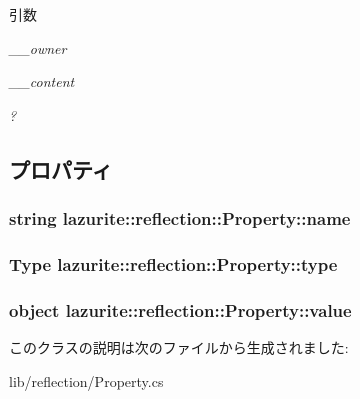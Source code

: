 \begin{DoxyParams}{引数}
\item[{\em \_\-\_\-owner}]\item[{\em \_\-\_\-content}]\item[{\em ?}]\end{DoxyParams}


\subsection{プロパティ}
\hypertarget{classlazurite_1_1reflection_1_1_property_aecae67b838879bf8710e29bbe20c26c4}{
\subsubsection[{name}]{\setlength{\rightskip}{0pt plus 5cm}string lazurite::reflection::Property::name}}
\label{classlazurite_1_1reflection_1_1_property_aecae67b838879bf8710e29bbe20c26c4}
\hypertarget{classlazurite_1_1reflection_1_1_property_a9582a84bece926e0c44be9dd0f66a555}{
\subsubsection[{type}]{\setlength{\rightskip}{0pt plus 5cm}Type lazurite::reflection::Property::type}}
\label{classlazurite_1_1reflection_1_1_property_a9582a84bece926e0c44be9dd0f66a555}
\hypertarget{classlazurite_1_1reflection_1_1_property_acd06a0e4b2b495b89ee445b2e217dd5b}{
\subsubsection[{value}]{\setlength{\rightskip}{0pt plus 5cm}object lazurite::reflection::Property::value}}
\label{classlazurite_1_1reflection_1_1_property_acd06a0e4b2b495b89ee445b2e217dd5b}


このクラスの説明は次のファイルから生成されました:\begin{DoxyCompactItemize}
\item 
lib/reflection/Property.cs\end{DoxyCompactItemize}
